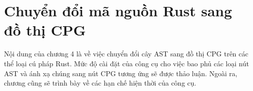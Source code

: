 \chapter{Chuyển đổi mã nguồn Rust sang đồ thị CPG}
\label{chap:mapping}


Nội dung của chương 4 là về việc chuyển đổi cây AST sang đồ thị CPG trên các thể loại cú pháp Rust.
Mức độ cài đặt của công cụ cho việc bao phủ các loại nút AST và ánh xạ chúng sang nút CPG tương ứng sẽ được thảo luận.
Ngoài ra, chương cũng sẽ trình bày về các hạn chế hiện thời của công cụ.





% 
% 
